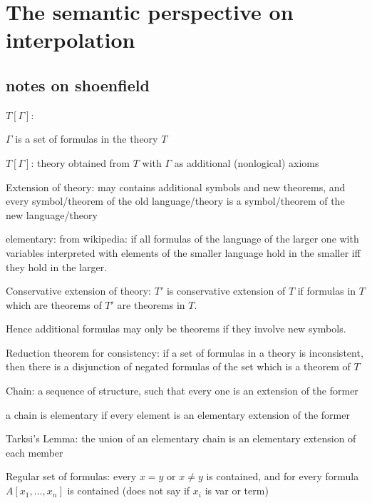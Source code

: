 
\chapter{The semantic perspective on interpolation}



\section{notes on shoenfield}

\begin{description}
	\item{$T[\Gamma]$:}

$\Gamma$ is a set of formulas in the theory $T$

$T[\Gamma]$: theory obtained from $T$ with $\Gamma$ as additional (nonlogical) axioms


	\item{Extension of theory:}
		may contains additional symbols and new theorems, and every symbol/theorem of the old language/theory is a symbol/theorem of the new language/theory

		elementary: from wikipedia: if all formulas of the language of the larger one with variables interpreted with elements of the smaller language hold in the smaller iff they hold in the larger.

	\item{Conservative extension of theory:}
		$T'$ is conservative extension of $T$ if formulas in $T$ which are theorems of $T'$ are theorems in $T$.

		Hence additional formulas may only be theorems if they involve new symbols.

	\item{Reduction theorem for consistency:}
		if a set of formulas in a theory is inconsistent, then there is a disjunction of negated formulas of the set which is a theorem of $T$

	\item{Chain:}
		a sequence of structure, such that every one is an extension of the former

		a chain is elementary if every element is an elementary extension of the former

	\item{Tarksi's Lemma:}
		the union of an elementary chain is an elementary extension of each member

	\item{Regular set of formulas:} 
		every $x=y$ or $x\neq y$ is contained, and for every formula $A[x_1, \dots, x_n]$ is contained (does not say if $x_i$ is var or term)

\end{description}

